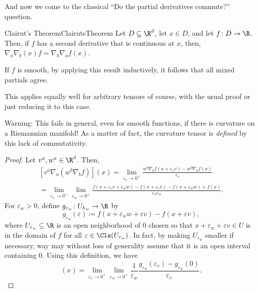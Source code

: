 And now we come to the classical ``Do the partial derivatives commute?'' question.
\begin{thm}{Clairut's Theorem}{ClairutsTheorem}
Let $D\subseteq \R ^d$, let $x\in D$, and let $f\colon D\rightarrow \R$.  Then, if $f$ has a second derivative that is continuous at $x$, then, $\nabla _a\nabla _b(x)f=\nabla _b\nabla _af(x)$.
\begin{rmk}
If $f$ is smooth, by applying this result inductively, it follows that all mixed partials agree.
\end{rmk}
\begin{rmk}
This applies equally well for arbitrary tensors of course, with the usual proof or just reducing it to this case.
\end{rmk}
\begin{wrn}
Warning:  This fails in general, even for smooth functions, if there is curvature on a Riemannian manifold!  As a matter of fact, the curvature tensor is \emph{defined} by this lack of commutativity.
\end{wrn}
\begin{proof}
Let $v^a,w^a\in \R ^d$.  Then,
{\scriptsize
\begin{equation*}
\begin{multlined}
[v^a\nabla _a(w^b\nabla _bf)](x)=\lim _{\varepsilon _v\to 0^+}\frac{w^b\nabla _bf(x+\varepsilon _vv)-w^b\nabla _bf(x)}{\varepsilon _v} \\ =\lim _{\varepsilon _v\to 0^+}\lim _{\varepsilon _w\to 0^+}\frac{f(x+\varepsilon _vv+\varepsilon _ww)-f(x+\varepsilon _vv)-f(x+\varepsilon _ww)+f(x)}{\varepsilon _v\varepsilon _w}.
\end{multlined}
\end{equation*}
}
For $\varepsilon _w>0$, define $g_{\varepsilon _w}\colon U_{h_w}\rightarrow \R$ by
\begin{equation}
g_{\varepsilon _w}(\varepsilon )\coloneqq f(x+\varepsilon _ww+\varepsilon v)-f(x+\varepsilon v),
\end{equation}
where $U_{\varepsilon _w}\subseteq \R $ is an open neighborhood of $0$ chosen so that $x+\varepsilon _w+\varepsilon v\in U$ is in the domain of $f$ for all $\varepsilon \in \Cls (U_{\varepsilon _w})$.  In fact, by making $U_{\varepsilon _w}$ smaller if necessary, way may without loss of generality assume that it is an open interval containing $0$.  Using this definition, we have
\begin{equation*}
[v^a\nabla _a(w^b\nabla _bf)](x)=\lim _{\varepsilon _v\to 0^+}\lim _{\varepsilon _w\to 0^+}\frac{1}{\varepsilon _w}\frac{g_{\varepsilon _w}(\varepsilon _v)-g_{\varepsilon _w}(0)}{\varepsilon _v}.

\end{equation*}
\end{proof}
\end{thm}
